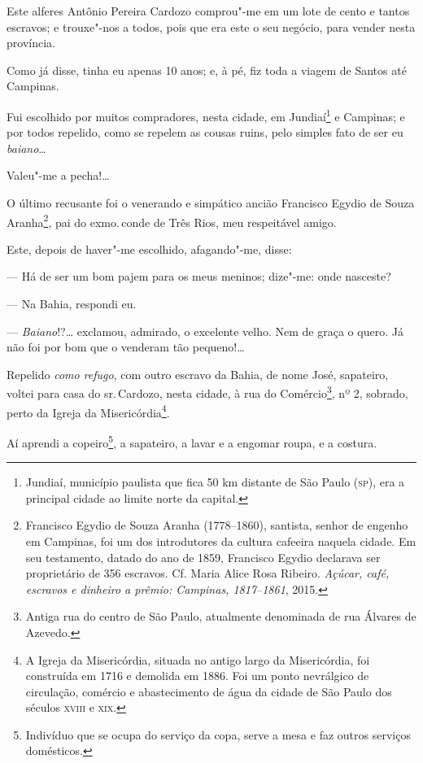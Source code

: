 Este alferes Antônio Pereira Cardozo comprou"-me em um lote de cento e
tantos escravos; e trouxe"-nos a todos, pois que era este o seu negócio,
para vender nesta província.

Como já disse, tinha eu apenas 10 anos; e, à pé, fiz toda a viagem de
Santos até Campinas.

Fui escolhido por muitos compradores, nesta cidade, em Jundiaí\footnote{
  Jundiaí, município paulista que fica 50 km distante de São Paulo (\textsc{sp}),
  era a principal cidade ao limite norte da capital.} e Campinas; e por
todos repelido, como se repelem as cousas ruins, pelo simples fato de
ser eu \emph{baiano}\ldots{}

Valeu"-me a pecha!\ldots{}

O último recusante foi o venerando e simpático ancião Francisco Egydio
de Souza Aranha\footnote{Francisco Egydio de Souza Aranha (1778--1860),
  santista, senhor de engenho em Campinas, foi um dos introdutores
  da cultura cafeeira naquela cidade. Em seu testamento, datado do ano
  de 1859, Francisco Egydio declarava ser proprietário de 356 escravos.
  Cf. Maria Alice Rosa Ribeiro. \emph{Açúcar, café, escravos e dinheiro
  a prêmio: Campinas, 1817--1861}, 2015.}, pai do exmo.\,conde de Três Rios, meu
respeitável amigo.

Este, depois de haver"-me escolhido, afagando"-me, disse:

--- Há de ser um bom pajem para os meus meninos; dize"-me: onde
nasceste?

--- Na Bahia, respondi eu.

--- \emph{Baiano}!?\ldots{} exclamou, admirado, o excelente velho. Nem de
graça o quero. Já não foi por bom que o venderam tão pequeno!\ldots{}

Repelido \emph{como refugo}, com outro escravo da Bahia, de nome José,
sapateiro, voltei para casa do sr.\,Cardozo, nesta cidade, à rua do
Comércio\footnote{Antiga rua do centro de São Paulo, atualmente
  denominada de rua Álvares de Azevedo.}, nº 2, sobrado, perto da Igreja
da Misericórdia\footnote{A Igreja da Misericórdia, situada no antigo
  largo da Misericórdia, foi construída em 1716 e demolida em 1886. Foi
  um ponto nevrálgico de circulação, comércio e abastecimento de água da
  cidade de São Paulo dos séculos \textsc{xviii} e \textsc{xix}.}.

Aí aprendi a copeiro\footnote{Indivíduo que se ocupa do serviço da
  copa, serve a mesa e faz outros serviços domésticos.}, a sapateiro, a
lavar e a engomar roupa, e a costura.

